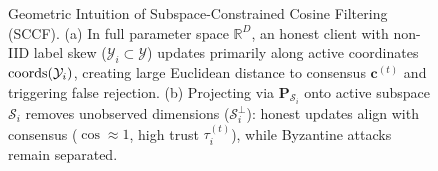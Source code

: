 \begin{figure}[t]
{\begin{tikzpicture}[
    every node/.style={font=\scriptsize},
    vector/.style={-Stealth, thick},
    projline/.style={dashed, thick},
    axis/.style={->, >=Stealth, semithick, black}
]
\end{tikzpicture}%
}
\caption{Geometric Intuition of Subspace-Constrained Cosine Filtering (SCCF). (a) In full parameter space $\mathbb{R}^D$, an honest client with non-IID label skew ($\mathcal{Y}_i \subset \mathcal{Y}$) updates primarily along active coordinates $\operatorname{coords}(\mathcal{Y}_i)$, creating large Euclidean distance to consensus $\mathbf{c}^{(t)}$ and triggering false rejection. (b) Projecting via $\mathbf{P}_{\mathcal{S}_i}$ onto active subspace $\mathcal{S}_i$ removes unobserved dimensions ($\mathcal{S}_i^\perp$): honest updates align with consensus ($\cos \approx 1$, high trust $\tau_i^{(t)}$), while Byzantine attacks remain separated.}
\label{fig:sccf_geometry}
\end{figure}
